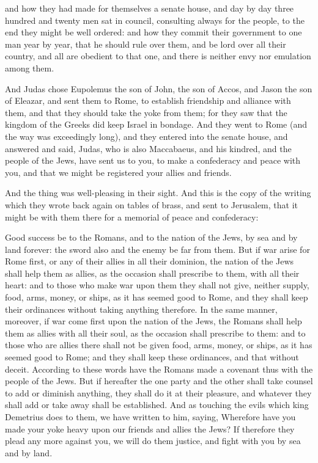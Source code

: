 {and how they had made for themselves a senate house, and day by day three hundred and twenty men sat in council, consulting always for the people, to the end they might be well ordered:
and how they commit their government to one man year by year, that he should rule over them, and be lord over all their country, and all are obedient to that one, and there is neither envy nor emulation among them.
\par }{\PP {}And Judas chose Eupolemus the son of John, the son of Accos, and Jason the son of Eleazar, and sent them to Rome, to establish friendship and alliance with them,
and that they should take the yoke from them; for they saw that the kingdom of the Greeks did keep Israel in bondage.
And they went to Rome (and the way was exceedingly long), and they entered into the senate house, and answered and said,
Judas, who is also
{} Maccabaeus, and his kindred, and the people of the Jews, have sent us to you, to make a confederacy and peace with you, and that we might be registered your allies and friends.
\par }{\PP {}And the thing was well-pleasing in their sight.
And this is the copy of the writing which they wrote back again on tables of brass, and sent to Jerusalem, that it might be with them there for a memorial of peace and confederacy:
\par }{\PP {}Good success be to the Romans, and to the nation of the Jews, by sea and by land forever: the sword also and the enemy be far from them.
But if war arise for Rome first, or any of their allies in all their dominion,
the nation of the Jews shall help them as allies, as the occasion shall prescribe to them, with all their heart:
and to those who make war upon them they shall not give, neither supply, food, arms, money, or ships, as it has seemed good to Rome, and they shall keep their ordinances without taking anything therefore.
In the same manner, moreover, if war come first upon the nation of the Jews, the Romans shall help them as allies with all their soul, as the occasion shall prescribe to them:
and to those who are allies
{} there shall not be given food, arms, money, or ships, as it has seemed good to Rome; and they shall keep these ordinances, and that without deceit.
According to these words have the Romans made a covenant thus with the people of the Jews.
But if hereafter the one party and the other shall take counsel to add or diminish anything, they shall do it at their pleasure, and whatever they shall add or take away shall be established.
And as touching the evils which king Demetrius does to them, we have written to him, saying, Wherefore have you made your yoke heavy upon our friends and allies the Jews?
If therefore they plead any more against you, we will do them justice, and fight with you by sea and by land.

}

